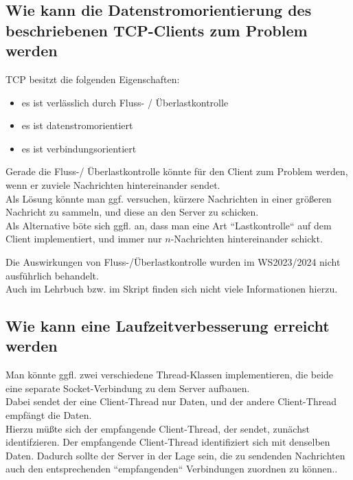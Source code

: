 \subsection*{Wie kann die Datenstromorientierung des beschriebenen TCP-Clients zum Problem werden}
TCP besitzt die folgenden Eigenschaften:

\begin{itemize}
    \item es ist verlässlich durch Fluss- / Überlastkontrolle
    \item es ist datenstromorientiert
    \item es ist verbindungsorientiert
\end{itemize}

Gerade die Fluss-/ Überlastkontrolle könnte für den Client zum Problem werden, wenn er zuviele Nachrichten hintereinander sendet.\\
\noindent
Als Lösung könnte man ggf. versuchen, kürzere Nachrichten in einer größeren Nachricht zu sammeln, und diese an den Server zu schicken.\\
\noindent
Als Alternative böte sich ggfl. an, dass man eine Art ``Lastkontrolle`` auf dem Client implementiert, und immer nur $n$-Nachrichten hintereinander schickt.

\begin{tcolorbox}[colback=red!20,color=white,title=Anmerkung]
    Die Auswirkungen von Fluss-/Überlastkontrolle wurden im WS2023/2024 nicht ausführlich behandelt.\\
    Auch im Lehrbuch bzw. im Skript finden sich nicht viele Informationen hierzu.
\end{tcolorbox}

\subsection*{Wie kann eine Laufzeitverbesserung erreicht werden}
Man könnte ggfl. zwei verschiedene Thread-Klassen implementieren, die beide eine separate Socket-Verbindung zu dem Server aufbauen.\\
Dabei sendet der eine Client-Thread nur Daten, und der andere Client-Thread empfängt die Daten.\\
Hierzu müßte sich der empfangende Client-Thread, der sendet, zunächst identifzieren.
Der empfangende Client-Thread identifiziert sich mit denselben Daten.
Dadurch sollte der Server in der Lage sein, die zu sendenden Nachrichten auch den entsprechenden ``empfangenden`` Verbindungen zuordnen zu können..\\


